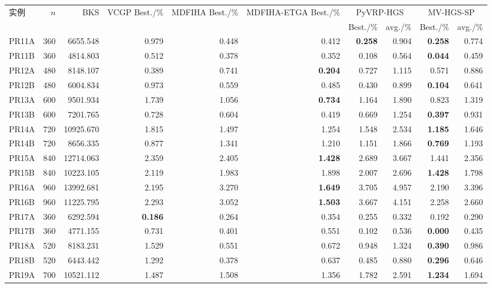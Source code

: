 \begin{tabular}{@{}lrrrrrrrrr@{}}
\toprule
实例 & $n$ & BKS & VCGP Best./\% & MDFIHA Best./\% & MDFIHA-ETGA Best./\% & \multicolumn{2}{c}{PyVRP-HGS} & \multicolumn{2}{c}{MV-HGS-SP}\\
 &  &  &  &  &  & Best./\% & avg./\% & Best./\% & avg./\%\\
\midrule
PR11A & 360 & 6655.548 & 0.979 & 0.448 & 0.412 & \textbf{0.258} & 0.904 & \textbf{0.258} & 0.774 \\
PR11B & 360 & 4814.803 & 0.512 & 0.378 & 0.352 & 0.108 & 0.564 & \textbf{0.044} & 0.459 \\
PR12A & 480 & 8148.107 & 0.389 & 0.741 & \textbf{0.204} & 0.727 & 1.115 & 0.571 & 0.886 \\
PR12B & 480 & 6004.834 & 0.973 & 0.559 & 0.485 & 0.430 & 0.899 & \textbf{0.104} & 0.641 \\
PR13A & 600 & 9501.934 & 1.739 & 1.056 & \textbf{0.734} & 1.164 & 1.890 & 0.823 & 1.319 \\
PR13B & 600 & 7201.765 & 0.728 & 0.604 & 0.419 & 0.669 & 1.254 & \textbf{0.397} & 0.931 \\
PR14A & 720 & 10925.670 & 1.815 & 1.497 & 1.254 & 1.548 & 2.534 & \textbf{1.185} & 1.646 \\
PR14B & 720 & 8656.335 & 0.877 & 1.341 & 1.210 & 1.151 & 1.866 & \textbf{0.769} & 1.193 \\
PR15A & 840 & 12714.063 & 2.359 & 2.405 & \textbf{1.428} & 2.689 & 3.667 & 1.441 & 2.356 \\
PR15B & 840 & 10223.105 & 2.119 & 1.983 & 1.898 & 2.007 & 2.696 & \textbf{1.428} & 1.798 \\
PR16A & 960 & 13992.681 & 2.195 & 3.270 & \textbf{1.649} & 3.705 & 4.957 & 2.190 & 3.396 \\
PR16B & 960 & 11225.795 & 2.293 & 3.052 & \textbf{1.503} & 3.667 & 4.151 & 2.258 & 2.660 \\
PR17A & 360 & 6292.594 & \textbf{0.186} & 0.264 & 0.354 & 0.255 & 0.332 & 0.192 & 0.290 \\
PR17B & 360 & 4771.155 & 0.731 & 0.401 & 0.551 & 0.102 & 0.536 & \textbf{0.000} & 0.435 \\
PR18A & 520 & 8183.231 & 1.529 & 0.551 & 0.672 & 0.948 & 1.324 & \textbf{0.390} & 0.986 \\
PR18B & 520 & 6443.442 & 1.292 & 0.378 & 0.637 & 0.485 & 0.880 & \textbf{0.296} & 0.646 \\
PR19A & 700 & 10521.112 & 1.487 & 1.508 & 1.356 & 1.782 & 2.591 & \textbf{1.234} & 1.694 \\

\end{tabular}
